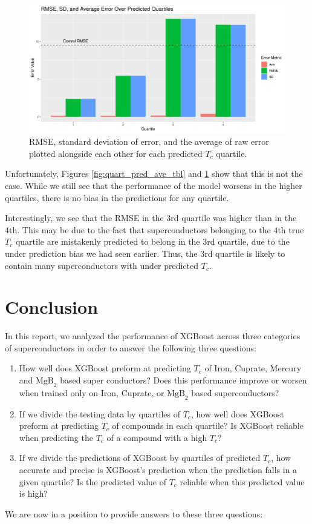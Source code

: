 \documentclass[oneside,12pt]{amsart}
\begin{document}
\begin{figure}
    \centering
    \includegraphics[width = 0.7\linewidth]{../Plots/Pred_Q_error_brplt.png}
    \caption{RMSE, standard deviation of error, and the average of raw error plotted alongside each other for each predicted $T_c$ quartile.}
    \label{fig:Pred_Q_Ave_brplt}
\end{figure}

Unfortunately, Figures \ref{fig:quart_pred_ave_tbl} and \ref{fig:Pred_Q_Ave_brplt} show that this is not the case. While we still see that the performance of the model worsens in the higher quartiles, there is no bias in the predictions for any quartile. 

Interestingly, we see that the RMSE in the 3rd quartile was higher than in the 4th. This may be due to the fact that superconductors belonging to the 4th true $T_c$ quartile are mistakenly predicted to belong in the 3rd quartile, due to the under prediction bias we had seen earlier. Thus, the 3rd quartile is likely to contain many superconductors with under predicted $T_c$. 

\section{Conclusion}

In this report, we analyzed the performance of XGBoost across three categories of superconductors in order to answer the following three questions:

 \begin{enumerate}
     \item How well does XGBoost preform at predicting $T_c$ of Iron, Cuprate, Mercury and $\text{MgB}_2$ based super conductors? Does this performance improve or worsen when trained only on Iron, Cuprate, or $\text{MgB}_2$ based superconductors?
     \item If we divide the testing data by quartiles of $T_c$, how well does XGBoost preform at predicting $T_c$ of compounds in each quartile? Is XGBoost reliable when predicting the $T_c$ of a compound with a high $T_c$?
     \item If we divide the predictions of XGBoost by quartiles of predicted $T_c$, how accurate and precise is XGBoost's prediction when the prediction falls in a given quartile? Is the predicted value of $T_c$ reliable when this predicted value is high?
 \end{enumerate}
 We are now in a position to provide answers to these three questions:
 
\end{document}
